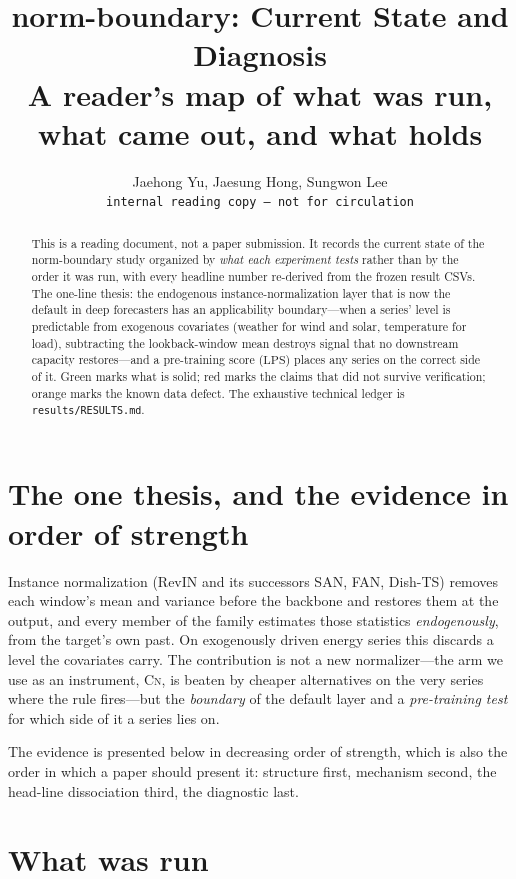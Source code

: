 \documentclass{article}
\title{norm-boundary: Current State and Diagnosis\\
{\large\normalfont A reader's map of what was run, what came out, and what holds}}
\author{%
  Jaehong Yu, Jaesung Hong, Sungwon Lee\\
  \texttt{internal reading copy --- not for circulation}
}
\newcommand{\lps}{\ensuremath{\mathrm{LPS}}}
\newcommand{\cnm}{\textsc{Cn}}
\begin{document}
\maketitle

\begin{abstract}
This is a reading document, not a paper submission. It records the current
state of the norm-boundary study organized by \emph{what each experiment
tests} rather than by the order it was run, with every headline number
re-derived from the frozen result CSVs. The one-line thesis: the endogenous
instance-normalization layer that is now the default in deep forecasters has
an applicability boundary---when a series' level is predictable from exogenous
covariates (weather for wind and solar, temperature for load), subtracting the
lookback-window mean destroys signal that no downstream capacity restores---and
a pre-training score (\lps) places any series on the correct side of it. Green
marks what is solid; red marks the claims that did not survive verification;
orange marks the known data defect. The exhaustive technical ledger is
\texttt{results/RESULTS.md}.
\end{abstract}

\section{The one thesis, and the evidence in order of strength}

Instance normalization (RevIN and its successors SAN, FAN, Dish-TS) removes each
window's mean and variance before the backbone and restores them at the output,
and every member of the family estimates those statistics \emph{endogenously},
from the target's own past. On exogenously driven energy series this discards a
level the covariates carry. The contribution is not a new normalizer---the arm
we use as an instrument, \cnm, is beaten by cheaper alternatives on the very
series where the rule fires---but the \emph{boundary} of the default layer and a
\emph{pre-training test} for which side of it a series lies on.

The evidence is presented below in decreasing order of strength, which is also
the order in which a paper should present it: structure first, mechanism second,
the head-line dissociation third, the diagnostic last.

\section{What was run}
\end{document}
